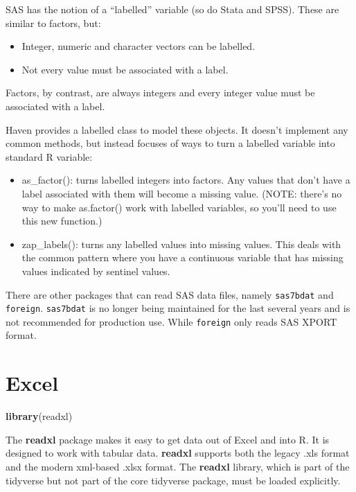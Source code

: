 \documentclass[]{book}
\newenvironment{Shaded}{\begin{snugshade}}{\end{snugshade}}
\newcommand{\KeywordTok}[1]{\textcolor[rgb]{0.13,0.29,0.53}{\textbf{#1}}}
\newcommand{\NormalTok}[1]{#1}
\theoremstyle{definition}
\theoremstyle{definition}
\theoremstyle{definition}
\theoremstyle{remark}
\let\BeginKnitrBlock\begin \let\EndKnitrBlock\end
\begin{document}
SAS has the notion of a ``labelled'' variable (so do Stata and SPSS).
These are similar to factors, but:

\begin{itemize}
\item
  Integer, numeric and character vectors can be labelled.
\item
  Not every value must be associated with a label.
\end{itemize}

Factors, by contrast, are always integers and every integer value must
be associated with a label.

Haven provides a labelled class to model these objects. It doesn't
implement any common methods, but instead focuses of ways to turn a
labelled variable into standard R variable:

\begin{itemize}
\item
  as\_factor(): turns labelled integers into factors. Any values that
  don't have a label associated with them will become a missing value.
  (NOTE: there's no way to make as.factor() work with labelled
  variables, so you'll need to use this new function.)
\item
  zap\_labels(): turns any labelled values into missing values. This
  deals with the common pattern where you have a continuous variable
  that has missing values indicated by sentinel values.
\end{itemize}

\BeginKnitrBlock{rmdwarning}
There are other packages that can read SAS data files, namely
\texttt{sas7bdat} and \texttt{foreign}. \texttt{sas7bdat} is no longer
being maintained for the last several years and is not recommended for
production use. While \texttt{foreign} only reads SAS XPORT format.
\EndKnitrBlock{rmdwarning}

\section{Excel}\label{excel}

\begin{Shaded}
\begin{Highlighting}[]
\KeywordTok{library}\NormalTok{(readxl)}
\end{Highlighting}
\end{Shaded}

The \textbf{readxl} package makes it easy to get data out of Excel and
into R. It is designed to work with tabular data. \textbf{readxl}
supports both the legacy .xls format and the modern xml-based .xlsx
format. The \textbf{readxl} library, which is part of the tidyverse but
not part of the core tidyverse package, must be loaded explicitly.
\end{document}

